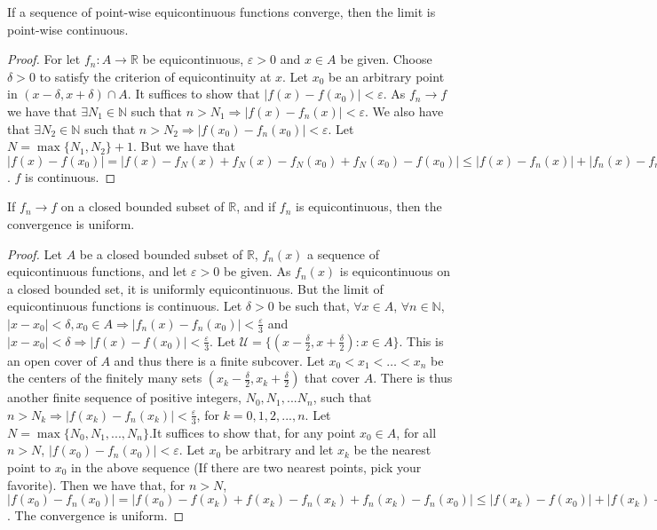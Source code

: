         \begin{theorem}
            If a sequence of point-wise equicontinuous functions converge, then the limit is point-wise continuous.
        \end{theorem}
        \begin{proof}
            For let $f_n:A\rightarrow \mathbb{R}$ be equicontinuous, $\varepsilon>0$ and $x\in A$ be given. Choose $\delta>0$ to satisfy the criterion of equicontinuity at $x$. Let $x_0$ be an arbitrary point in $(x-\delta,x+\delta)\cap A$. It suffices to show that $|f(x) - f(x_0)|<\varepsilon$. As $f_n \rightarrow f$ we have that $\exists N_1 \in\mathbb{N}$ such that $n>N_1\Rightarrow |f(x) - f_n(x)|<\varepsilon$. We also have that $\exists N_2 \in \mathbb{N}$ such that $n>N_2 \Rightarrow |f(x_0)-f_n(x_0)|<\varepsilon$. Let $N=\max\{N_1,N_2\}+1$. But we have that $|f(x) - f(x_0)| = |f(x) - f_N(x) + f_N(x)-f_N(x_0) + f_N(x_0) - f(x_0)|\leq |f(x) - f_n(x)| + |f_n(x)-f_n(x_0)| + |f_n(x_0) - f(x_0)| < 3\varepsilon$. $f$ is continuous.
        \end{proof}
        \begin{theorem}
            If $f_n \rightarrow f$ on a closed bounded subset of $\mathbb{R}$, and if $f_n$ is equicontinuous, then the convergence is uniform.
        \end{theorem}
        \begin{proof}
            Let $A$ be a closed bounded subset of $\mathbb{R}$, $f_n(x)$ a sequence of equicontinuous functions, and let $\varepsilon>0$ be given. As $f_n(x)$ is equicontinuous on a closed bounded set, it is uniformly equicontinuous. But the limit of equicontinuous functions is continuous. Let $\delta>0$ be such that, $\forall x\in A$, $\forall n\in\mathbb{N}$, $|x-x_0|<\delta, x_0\in A \Rightarrow |f_n(x)-f_n(x_0)|<\frac{\varepsilon}{3}$ and $|x-x_0|<\delta \Rightarrow |f(x)-f(x_0)|<\frac{\varepsilon}{3}$. Let $\mathcal{U} = \{(x-\frac{\delta}{2},x+\frac{\delta}{2}): x\in A\}$. This is an open cover of $A$ and thus there is a finite subcover. Let $x_0<x_1<\hdots<x_n$ be the centers of the finitely many sets $(x_k-\frac{\delta}{2},x_k+\frac{\delta}{2})$ that cover $A$. There is thus another finite sequence of positive integers, $N_0, N_1,... N_n$, such that $n>N_k \Rightarrow |f(x_k)-f_n(x_k)|<\frac{\varepsilon}{3}$, for $k=0,1,2,...,n$. Let $N= \max\{N_0, N_1, ..., N_n\}$.It suffices to show that, for any point $x_0 \in A$, for all $n>N$, $|f(x_0)-f_n(x_0)|<\varepsilon$. Let $x_0$ be arbitrary and let $x_k$ be the nearest point to $x_0$ in the above sequence (If there are two nearest points, pick your favorite). Then we have that, for $n>N$, $|f(x_0) - f_n(x_0)| = |f(x_0)-f(x_k)+f(x_k)-f_n(x_k)+f_n(x_k)-f_n(x_0)|\leq |f(x_k)-f(x_0)|+|f(x_k)-f_n(x_k)|+|f_n(x_k)-f_n(x_0)|<\varepsilon$. The convergence is uniform.
        \end{proof}
